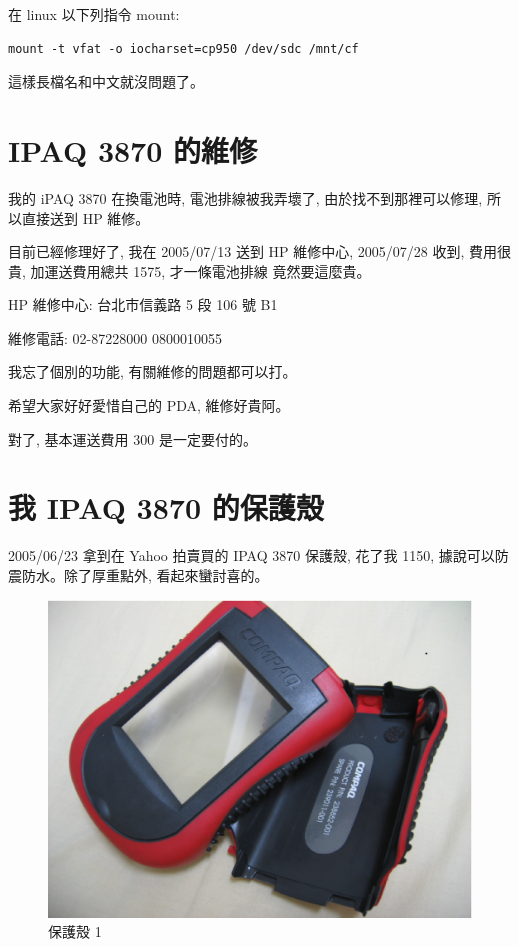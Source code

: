 \documentclass[12pt,a4paper]{article}
\begin{document}
\begin{CJK}{UTF8}{cwmu}
在 linux 以下列指令 mount:
\begin{verbatim}
mount -t vfat -o iocharset=cp950 /dev/sdc /mnt/cf
\end{verbatim}

這樣長檔名和中文就沒問題了。

\section{IPAQ 3870 的維修}
我的 iPAQ 3870 在換電池時, 電池排線被我弄壞了, 
由於找不到那裡可以修理, 所以直接送到 HP 維修。

目前已經修理好了, 我在 2005/07/13 送到 HP 維修中心,
2005/07/28 收到, 費用很貴,
加運送費用總共 1575, 才一條電池排線
竟然要這麼貴。

HP 維修中心: 台北市信義路 5 段 106 號 B1

        維修電話: 02-87228000
                  0800010055

        我忘了個別的功能,
        有關維修的問題都可以打。

希望大家好好愛惜自己的 PDA, 維修好貴阿。

對了, 基本運送費用 300 是一定要付的。

\section{我 IPAQ 3870 的保護殼}
2005/06/23 拿到在 Yahoo 拍賣買的 IPAQ 3870 保護殼,
花了我 1150, 據說可以防震防水。除了厚重點外,
看起來蠻討喜的。

\begin{figure}[htbp]
\centering
\includegraphics[scale=0.4]{eps/shell_1.eps}
\caption{保護殼 1}
\end{figure}


\end{CJK}
\end{document}
